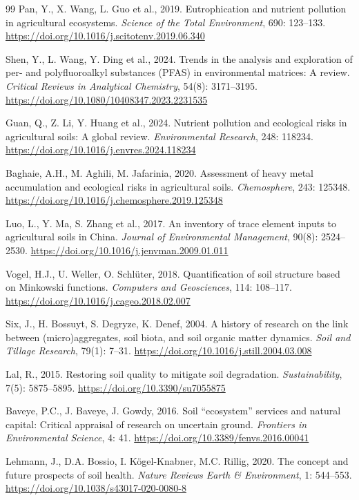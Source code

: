 \documentclass[sn-mathphys-num]{sn-jnl}
\begin{document}
\begin{thebibliography}{99}
Pan, Y., X. Wang, L. Guo et al., 2019.
Eutrophication and nutrient pollution in agricultural ecosystems.
\textit{Science of the Total Environment}, 690: 123--133.
\url{https://doi.org/10.1016/j.scitotenv.2019.06.340}

Shen, Y., L. Wang, Y. Ding et al., 2024.
Trends in the analysis and exploration of per- and polyfluoroalkyl substances
(PFAS) in environmental matrices: A review.
\textit{Critical Reviews in Analytical Chemistry}, 54(8): 3171--3195.
\url{https://doi.org/10.1080/10408347.2023.2231535}

Guan, Q., Z. Li, Y. Huang et al., 2024.
Nutrient pollution and ecological risks in agricultural soils: A global
review.
\textit{Environmental Research}, 248: 118234.
\url{https://doi.org/10.1016/j.envres.2024.118234}

Baghaie, A.H., M. Aghili, M. Jafarinia, 2020.
Assessment of heavy metal accumulation and ecological risks in agricultural
soils.
\textit{Chemosphere}, 243: 125348.
\url{https://doi.org/10.1016/j.chemosphere.2019.125348}

Luo, L., Y. Ma, S. Zhang et al., 2017.
An inventory of trace element inputs to agricultural soils in China.
\textit{Journal of Environmental Management}, 90(8): 2524--2530.
\url{https://doi.org/10.1016/j.jenvman.2009.01.011}

Vogel, H.J., U. Weller, O. Schlüter, 2018.
Quantification of soil structure based on Minkowski functions.
\textit{Computers and Geosciences}, 114: 108--117.
\url{https://doi.org/10.1016/j.cageo.2018.02.007}

Six, J., H. Bossuyt, S. Degryze, K. Denef, 2004.
A history of research on the link between (micro)aggregates, soil biota, and
soil organic matter dynamics.
\textit{Soil and Tillage Research}, 79(1): 7--31.
\url{https://doi.org/10.1016/j.still.2004.03.008}

Lal, R., 2015.
Restoring soil quality to mitigate soil degradation.
\textit{Sustainability}, 7(5): 5875--5895.
\url{https://doi.org/10.3390/su7055875}

Baveye, P.C., J. Baveye, J. Gowdy, 2016.
Soil “ecosystem” services and natural capital: Critical appraisal of
research on uncertain ground.
\textit{Frontiers in Environmental Science}, 4: 41.
\url{https://doi.org/10.3389/fenvs.2016.00041}

Lehmann, J., D.A. Bossio, I. Kögel-Knabner, M.C. Rillig, 2020.
The concept and future prospects of soil health.
\textit{Nature Reviews Earth \& Environment}, 1: 544--553.
\url{https://doi.org/10.1038/s43017-020-0080-8}


\end{thebibliography}
\end{document}
